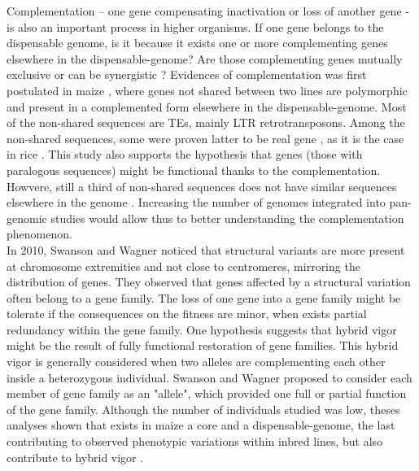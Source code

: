 \documentclass[a4paper,10pt,twoside]{report}
\begin{document}
Complementation – one gene compensating inactivation or loss of another gene - is also an important process in higher organisms. If one gene belongs to the dispensable genome, is it because it exists one or more complementing genes elsewhere in the dispensable-genome? Are those complementing genes mutually exclusive or can be synergistic ? 
Evidences of complementation was first postulated in maize \cite{Brunner2005}, where genes not shared between two lines are polymorphic and present in a complemented form elsewhere in the dispensable-genome. Most of the non-shared sequences are TEs, mainly LTR retrotransposons. 
Among the non-shared sequences, some were proven latter to be real gene \cite{Springer2009}, as it is the case in rice \cite{Schatz2014}.
This study also supports the hypothesis that genes (those with paralogous sequences) might be functional thanks to the complementation. Howvere, still a third of non-shared sequences does not have similar sequences elsewhere in the genome \cite{Springer2009}. Increasing the number of genomes integrated into pan-genomic studies would allow thus to better understanding the complementation phenomenon.\\

In 2010, Swanson and Wagner \cite{Swanson-Wagner2010} noticed that structural variants are more present at chromosome extremities and not close to centromeres, mirroring the distribution of genes. They observed that genes affected by a structural variation often belong to a gene family. The loss of one gene into a gene family might be tolerate if the consequences on the fitness are minor, when exists partial redundancy within the gene family. One hypothesis suggests that hybrid vigor might be the result of fully functional restoration of gene families. This hybrid vigor is generally considered when two alleles are complementing each other inside a heterozygous individual. Swanson and Wagner \cite{Swanson-Wagner2010} proposed to consider each member of gene family as an "allele", which provided one full or partial function of the gene family. Although the number of individuals studied was low, theses analyses shown that exists in maize a core and a dispensable-genome, the last contributing to observed phenotypic variations within inbred lines, but also contribute to hybrid vigor \cite{Hirsch2014}.
\end{document}
